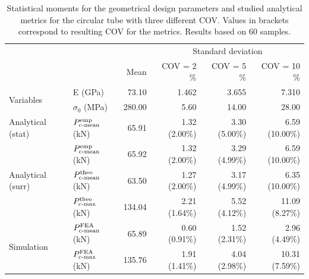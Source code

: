 \documentclass[12pt,number,preprint,review,times]{elsarticle}
\begin{document}
\begin{table}[!htpb]
\begin{center}
\begin{tabular}[t]{llrrrr} \toprule
 & &  &  \multicolumn{3}{c}{Standard deviation}  \\\cmidrule{4-6}
&  & Mean       &    COV = 2 \%  &  COV = 5 \%      &    COV = 10 \%  \\\midrule
\multirow{2}{*}{Variables} & E (GPa)  &  73.10 &  1.462 & 3.655 & 7.310   \\
 & $\sigma_0$ (MPa) &  280.00 & 5.60 & 14.00 & 28.00 \\ \midrule
\multirow{1}{*}{Analytical (stat)} & $P^{\mathrm{emp}}_{\mathrm{c{\text -}mean}}$ (kN) &  65.91  & 1.32 (2.00\%) &  3.30 (5.00\%) & 6.59 (10.00\%) \\\midrule
\multirow{3}{*}{Analytical (surr)} & $P^{\mathrm{emp}}_{\mathrm{c{\text -}mean}}$ (kN) &  65.92  & 1.32 (2.00\%) &  3.29 (4.99\%) & 6.59 (10.00\%) \\
& $P^{\mathrm{theo}}_{\mathrm{c{\text -}mean}}$ (kN) & 63.50  & 1.27 (2.00\%) & 3.17 (4.99\%) & 6.35 (10.00\%) \\
& $P^{\mathrm{theo}}_{\mathrm{c{\text -}max}}$ (kN) & 134.04  & 2.21 (1.64\%) & 5.52 (4.12\%) & 11.09 (8.27\%) \\ \midrule
\multirow{2}{*}{Simulation} & $P^{\mathrm{FEA}}_{\mathrm{c{\text -}mean}}$ (kN) &  65.89 & 0.60 (0.91\%) & 1.52 (2.31\%) & 2.96 (4.49\%)  \\
& $P^{\mathrm{FEA}}_{\mathrm{c{\text -}max}}$ (kN) &  135.76  & 1.91 (1.41\%) & 4.04 (2.98\%) & 10.31 (7.59\%) \\
\bottomrule
\end{tabular}
\captionsetup{justification=centering}
\caption{Statistical moments for the geometrical design parameters and studied analytical metrics for the circular tube with three different COV. Values in brackets correspond to resulting COV for the metrics. Results based on 60 samples.}
\label{tab:UQ_circ2}
\end{center}
\end{table}
\end{document}
